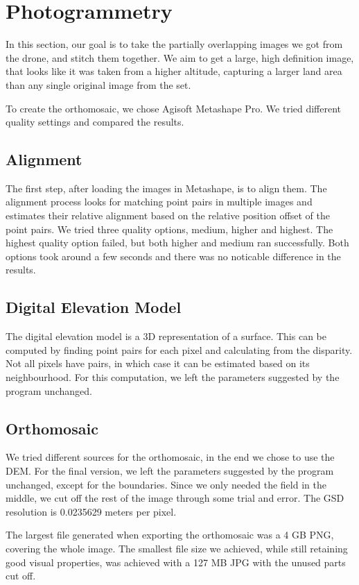 \documentclass[../Head/Main.tex]{subfiles}
\begin{document}
\section{Photogrammetry}
In this section, our goal is to take the partially overlapping images we got from the drone, and stitch them together.
We aim to get a large, high definition image, that looks like it was taken from a higher altitude, 
capturing a larger land area than any single original image from the set.

To create the orthomosaic, we chose Agisoft Metashape Pro. 
We tried different quality settings and compared the results.

\subsection{Alignment}

The first step, after loading the images in Metashape, is to align them.
The alignment process looks for matching point pairs in multiple images and estimates their relative alignment based on the relative position offset of the point pairs.
We tried three quality options, medium, higher and highest.
The highest quality option failed, but both higher and medium ran successfully.
Both options took around a few seconds and there was no noticable difference in the results.

\subsection{Digital Elevation Model}
The digital elevation model is a 3D representation of a surface.
This can be computed by finding point pairs for each pixel and calculating from the disparity.
Not all pixels have pairs, in which case it can be estimated based on its neighbourhood.
For this computation, we left the parameters suggested by the program unchanged.

\subsection{Orthomosaic}
We tried different sources for the orthomosaic, in the end we chose to use the DEM.
For the final version, we left the parameters suggested by the program unchanged, except for the boundaries.
Since we only needed the field in the middle, we cut off the rest of the image through some trial and error.
The GSD resolution is 0.0235629 meters per pixel.

The largest file generated when exporting the orthomosaic was a 4 GB PNG, covering the whole image. 
The smallest file size we achieved, while still retaining good visual properties, was achieved with a 127 MB JPG with the unused parts cut off.
\end{document}
